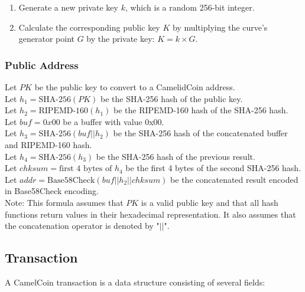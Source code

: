\documentclass{article}
\begin{document}
\begin{enumerate}
\item Generate a new private key $k$, which is a random 256-bit integer.
\item Calculate the corresponding public key $K$ by multiplying the curve's generator point $G$ by the private key: $K = k \times G$.
\end{enumerate}
\subsubsection{Public Address}

Let $PK$ be the public key to convert to a CamelidCoin address.\\
Let $h_1 = \text{SHA-256}(PK)$ be the SHA-256 hash of the public key.\\
Let $h_2 = \text{RIPEMD-160}(h_1)$ be the RIPEMD-160 hash of the SHA-256 hash.\\
Let $buf = 0x00$ be a buffer with value 0x00.\\
Let $h_3 = \text{SHA-256}(buf || h_2)$ be the SHA-256 hash of the concatenated buffer and RIPEMD-160 hash.\\
Let $h_4 = \text{SHA-256}(h_3)$ be the SHA-256 hash of the previous result.\\
Let $chksum = \text{first 4 bytes of } h_4$ be the first 4 bytes of the second SHA-256 hash.\\
Let $addr = \text{Base58Check}(buf || h_2 || chksum)$ be the concatenated result encoded in Base58Check encoding.\\

Note: This formula assumes that $PK$ is a valid public key and that all hash functions return values in their hexadecimal representation. It also assumes that the concatenation operator is denoted by "$||$".
\subsection{Transaction}

A CamelCoin transaction is a data structure consisting of several fields:
\end{document}
